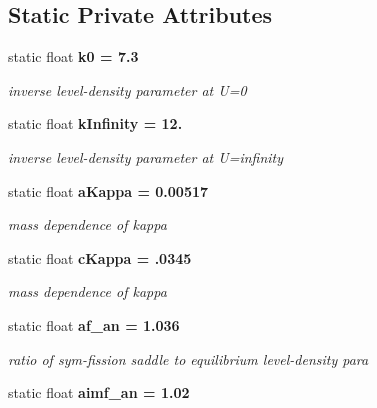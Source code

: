 \subsection*{Static Private Attributes}
\begin{CompactItemize}
\item 
static float \bf{k0} = 7.3\label{classCLevelDensity_2d81b36293e089d0ea9e207eb92f9839}

\begin{CompactList}\small\item\em inverse level-density parameter at U=0 \item\end{CompactList}\item 
static float \bf{k\-Infinity} = 12.\label{classCLevelDensity_7e962db0e85758cc3aa150bd33c7df56}

\begin{CompactList}\small\item\em inverse level-density parameter at U=infinity \item\end{CompactList}\item 
static float \bf{a\-Kappa} = 0.00517\label{classCLevelDensity_8aec4ef16f0210c7a75133707685b308}

\begin{CompactList}\small\item\em mass dependence of kappa \item\end{CompactList}\item 
static float \bf{c\-Kappa} = .0345\label{classCLevelDensity_dd31aa8f8f306f10f6f05e1baa4e5714}

\begin{CompactList}\small\item\em mass dependence of kappa \item\end{CompactList}\item 
static float \bf{af\_\-an} = 1.036\label{classCLevelDensity_2c9546a639a3bf40c0dbb6114bc0338b}

\begin{CompactList}\small\item\em ratio of sym-fission saddle to equilibrium level-density para \item\end{CompactList}\item 
static float \bf{aimf\_\-an} = 1.02\label{classCLevelDensity_18087f4cc08ed484bc2be0757dd56bf5}


\end{CompactItemize}
